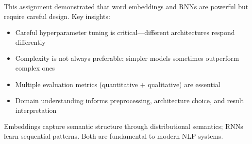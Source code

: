 \documentclass[12pt,a4paper]{article}
\begin{document}
This assignment demonstrated that word embeddings and RNNs are powerful but require careful design. Key insights:

\begin{itemize}
    \item Careful hyperparameter tuning is critical—different architectures respond differently
    \item Complexity is not always preferable; simpler models sometimes outperform complex ones
    \item Multiple evaluation metrics (quantitative + qualitative) are essential
    \item Domain understanding informs preprocessing, architecture choice, and result interpretation
\end{itemize}

Embeddings capture semantic structure through distributional semantics; RNNs learn sequential patterns. Both are fundamental to modern NLP systems.
\end{document}
